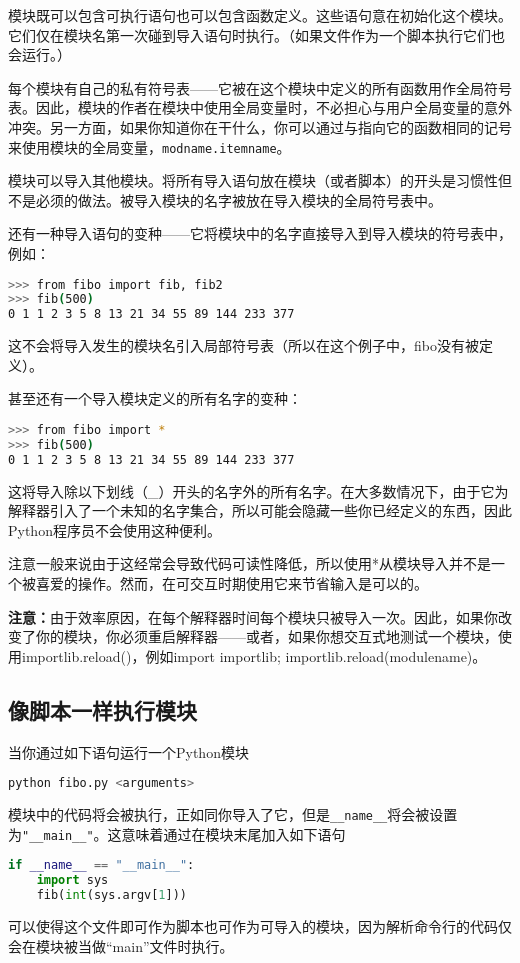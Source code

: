 \documentclass[../package_guide.tex]{subfiles}
\begin{document}
模块既可以包含可执行语句也可以包含函数定义。这些语句意在初始化这个模块。它们仅在模块名第一次碰到导入语句时执行。（如果文件作为一个脚本执行它们也会运行。）

每个模块有自己的私有符号表——它被在这个模块中定义的所有函数用作全局符号表。因此，模块的作者在模块中使用全局变量时，不必担心与用户全局变量的意外冲突。另一方面，如果你知道你在干什么，你可以通过与指向它的函数相同的记号来使用模块的全局变量，\lstinline{modname.itemname}。

模块可以导入其他模块。将所有导入语句放在模块（或者脚本）的开头是习惯性但不是必须的做法。被导入模块的名字被放在导入模块的全局符号表中。

还有一种导入语句的变种——它将模块中的名字直接导入到导入模块的符号表中，例如：
\begin{lstlisting}[language=bash]
>>> from fibo import fib, fib2
>>> fib(500)
0 1 1 2 3 5 8 13 21 34 55 89 144 233 377
\end{lstlisting}
这不会将导入发生的模块名引入局部符号表（所以在这个例子中，fibo没有被定义）。

甚至还有一个导入模块定义的所有名字的变种：
\begin{lstlisting}[language=bash]
>>> from fibo import *
>>> fib(500)
0 1 1 2 3 5 8 13 21 34 55 89 144 233 377
\end{lstlisting}
这将导入除以下划线（\_）开头的名字外的所有名字。在大多数情况下，由于它为解释器引入了一个未知的名字集合，所以可能会隐藏一些你已经定义的东西，因此Python程序员不会使用这种便利。

注意一般来说由于这经常会导致代码可读性降低，所以使用*从模块导入并不是一个被喜爱的操作。然而，在可交互时期使用它来节省输入是可以的。

\textbf{注意：}由于效率原因，在每个解释器时间每个模块只被导入一次。因此，如果你改变了你的模块，你必须重启解释器——或者，如果你想交互式地测试一个模块，使用importlib.reload()，例如import importlib; importlib.reload(modulename)。

\subsection{像脚本一样执行模块}

当你通过如下语句运行一个Python模块
\begin{lstlisting}[language=bash]
python fibo.py <arguments>
\end{lstlisting}
模块中的代码将会被执行，正如同你导入了它，但是\lstinline{__name__}将会被设置为\lstinline{"__main__"}。这意味着通过在模块末尾加入如下语句
\begin{lstlisting}[language=Python]
if __name__ == "__main__":
    import sys
    fib(int(sys.argv[1]))
\end{lstlisting}
可以使得这个文件即可作为脚本也可作为可导入的模块，因为解析命令行的代码仅会在模块被当做“main”文件时执行。
\end{document}
